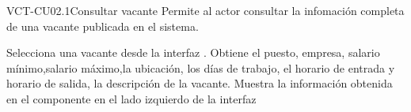 \begin{UseCase}[]{VCT-CU02.1}{Consultar vacante}{
	Permite al actor consultar la infomación completa de una vacante publicada en el sistema.
}
\end{UseCase}

\begin{UCtrayectoria}
	\UCpaso [\UCactor] Selecciona una vacante desde la interfaz .
	\UCpaso [\UCsist] Obtiene el puesto, empresa, salario mínimo,salario máximo,la ubicación,
	los días de trabajo, el horario de entrada y horario de salida, la descripción  de la vacante.
	\UCpaso [\UCsist] Muestra la información obtenida en el componente  en el lado izquierdo de la interfaz 
\end{UCtrayectoria}

